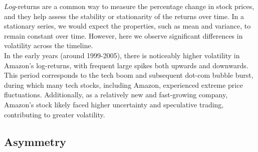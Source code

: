 \documentclass{article}
\begin{document}

\noindent $Log$-returns are a common way to measure the percentage change in stock prices, 
and they help assess the stability or stationarity of the returns over time. In a stationary series, we would expect the properties, 
such as mean and variance, to remain constant over time. 
However, here we observe significant differences in volatility across the timeline. \\

\noindent In the early years (around 1999-2005), there is noticeably higher volatility in Amazon's log-returns, 
with frequent large spikes both upwards and downwards. This period corresponds to the tech boom and subsequent dot-com bubble burst, 
during which many tech stocks, including Amazon, experienced extreme price fluctuations. 
Additionally, as a relatively new and fast-growing company, Amazon’s stock likely faced higher uncertainty and speculative trading, 
contributing to greater volatility.

\subsection{Asymmetry}
\end{document}
